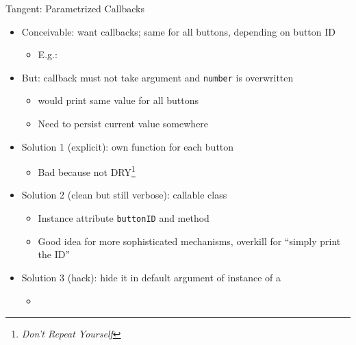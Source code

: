 \begin{frame}[fragile]{Tangent: Parametrized Callbacks}
%
\begin{itemize}
\item Conceivable: want callbacks; same for all buttons, depending on button ID
	\begin{itemize}
	\item E.\;g.: 
	\end{itemize}
\item But: callback must not take argument and \texttt{number} is overwritten 
	\begin{itemize}
	\item[\Thus]  would print same value for all buttons
	\item[\Thus] Need to persist current value somewhere
	\end{itemize}
\item Solution 1 (explicit): own function for each button
	\begin{itemize}
	\item Bad because not DRY\footnote{\emph{Don't Repeat Yourself}}
	\end{itemize}
\item Solution 2 (clean but still verbose): callable class
	\begin{itemize}
	\item Instance attribute \texttt{buttonID} and method 
	\item Good idea for more sophisticated mechanisms, overkill for \enquote{simply print the ID}
	\end{itemize}
\item Solution 3 (hack): hide it in default argument of instance of a 
	\begin{itemize}
	\item {}
	\end{itemize}
\end{itemize}
%
\end{frame}


